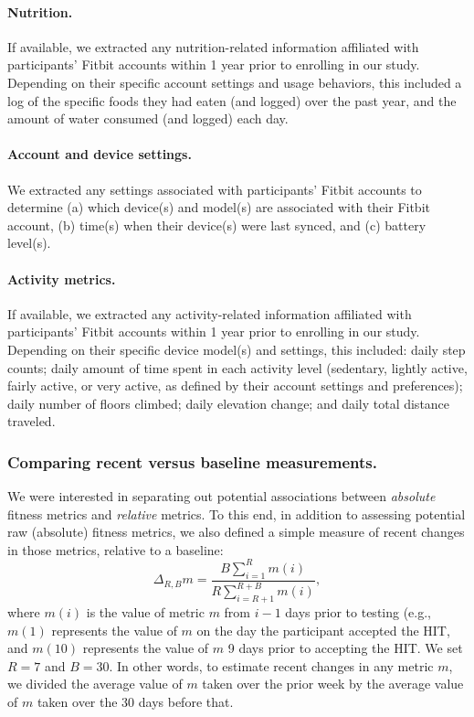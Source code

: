 \documentclass[10pt]{article}
\providecommand{\DIFaddtex}[1]{{\protect\color{blue}\uwave{#1}}} %
\providecommand{\DIFaddbegin}{} %
\providecommand{\DIFaddend}{} %
\providecommand{\DIFadd}[1]{\texorpdfstring{\DIFaddtex{#1}}{#1}} %
\newcommand{\DIFaddincludegraphics}[2][]{{\color{blue}\fbox{\DIFOincludegraphics[#1]{#2}}}} %
\DeclareRobustCommand{\DIFaddbegin}{\DIFOaddbegin \let\includegraphics\DIFaddincludegraphics} %
\DeclareRobustCommand{\DIFaddend}{\DIFOaddend \let\includegraphics\DIFOincludegraphics} %
\begin{document}
\paragraph{Nutrition.} If available, we extracted any
nutrition-related information affiliated with participants' Fitbit
accounts within 1 year prior to enrolling in our study. Depending on
their specific account settings and usage behaviors, this included a
log of the specific foods they had eaten (and logged) over the past
year, and the amount of water consumed (and logged) each day.

\paragraph{Account and device settings.}  We extracted any settings
associated with participants' Fitbit accounts to determine (a) which
device(s) and model(s) are associated with their Fitbit account, (b)
time(s) when their device(s) were last synced, and (c) battery
level(s).

\paragraph{Activity metrics.}  If available, we extracted any
activity-related information affiliated with participants' Fitbit
accounts within 1 year prior to enrolling in our study.  Depending on
their specific device model(s) and settings, this included: daily step
counts; daily amount of time spent in each activity level (sedentary,
lightly active, fairly active, or very active, as defined by their
account settings and preferences); daily number of floors climbed;
daily elevation change; and daily total distance traveled.



\subsubsection*{Comparing recent versus baseline measurements.}
We were interested in separating out potential associations between
\textit{absolute} fitness metrics and \textit{relative} metrics.  To
this end, in addition to assessing potential raw (absolute) fitness
metrics, we also defined a simple measure of recent changes in those
metrics, relative to a baseline:
\[
  \Delta_{R, B} m = \frac{B \sum_{i = 1}^R
  m(i)}{R \sum_{i=R + 1}^{R+B}m(i)},
\]
where $m(i)$ is the value of metric $m$ from $i - 1$ days prior to
testing (e.g., $m(1)$ represents the value of $m$ on the day the
participant accepted the HIT, and $m(10)$ represents the value of $m$
9 days prior to accepting the HIT\DIFaddbegin \DIFadd{)}\DIFaddend .  We set $R = 7$ and $B = 30$.  In
other words, to estimate recent changes in any metric $m$, we divided
the average value of $m$ taken over the prior week by the average
value of $m$ taken over the 30 days before that.
\end{document}
